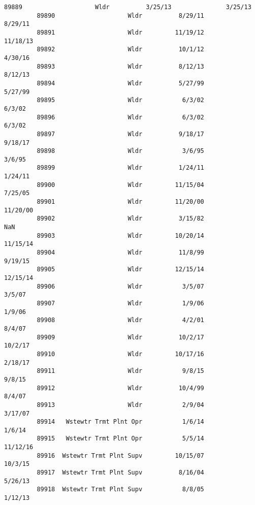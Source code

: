 \documentclass[11pt]{article}
\begin{document}
\begin{Verbatim}[commandchars=\\\{\}]
         89889                    Wldr          3/25/13               3/25/13   
         89890                    Wldr          8/29/11               8/29/11   
         89891                    Wldr         11/19/12              11/18/13   
         89892                    Wldr          10/1/12               4/30/16   
         89893                    Wldr          8/12/13               8/12/13   
         89894                    Wldr          5/27/99               5/27/99   
         89895                    Wldr           6/3/02                6/3/02   
         89896                    Wldr           6/3/02                6/3/02   
         89897                    Wldr          9/18/17               9/18/17   
         89898                    Wldr           3/6/95                3/6/95   
         89899                    Wldr          1/24/11               1/24/11   
         89900                    Wldr         11/15/04               7/25/05   
         89901                    Wldr         11/20/00              11/20/00   
         89902                    Wldr          3/15/82                   NaN   
         89903                    Wldr         10/20/14              11/15/14   
         89904                    Wldr          11/8/99               9/19/15   
         89905                    Wldr         12/15/14              12/15/14   
         89906                    Wldr           3/5/07                3/5/07   
         89907                    Wldr           1/9/06                1/9/06   
         89908                    Wldr           4/2/01                8/4/07   
         89909                    Wldr          10/2/17               10/2/17   
         89910                    Wldr         10/17/16               2/18/17   
         89911                    Wldr           9/8/15                9/8/15   
         89912                    Wldr          10/4/99                8/4/07   
         89913                    Wldr           2/9/04               3/17/07   
         89914   Wstewtr Trmt Plnt Opr           1/6/14                1/6/14   
         89915   Wstewtr Trmt Plnt Opr           5/5/14              11/12/16   
         89916  Wstewtr Trmt Plnt Supv         10/15/07               10/3/15   
         89917  Wstewtr Trmt Plnt Supv          8/16/04               5/26/13   
         89918  Wstewtr Trmt Plnt Supv           8/8/05               1/12/13   
         

\end{Verbatim}
\end{document}
